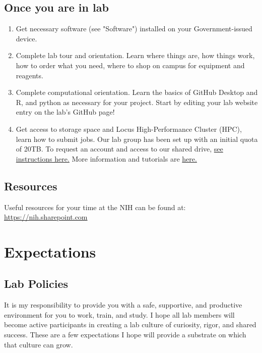\documentclass[10pt, letterpaper, twocolumn]{article} %
\begin{document}
\subsection{Once you are in lab}
\begin{enumerate}
\item Get necessary software (see "Software") installed on your Government-issued device.
\item Complete lab tour and orientation. Learn where things are, how things work, how to order what you need, where to shop on campus for equipment and reagents.
\item Complete computational orientation. Learn the basics of GitHub Desktop and R, and python as necessary for your project. Start by editing your lab website entry on the lab's GitHub page!
\item Get access to storage space and Locus High-Performance Cluster (HPC), learn how to submit jobs. Our lab group has been set up with an initial quota of 20TB. To request an account and access to our shared drive, \href{https://locus.niaid.nih.gov/userportal/documentation.php#Getting-Started/Request-an-Account}{see instructions here.} More information and tutorials are \href{https://locus.niaid.nih.gov}{here.}
\end{enumerate}

\subsection{Resources}
Useful resources for your time at the NIH can be found at: \href{https://nih.sharepoint.com}{https://nih.sharepoint.com}

\section{Expectations}
\subsection{Lab Policies}
It is my responsibility to provide you with a safe, supportive, and productive environment for you to work, train, and study. I hope all lab members will become active participants in creating a lab culture of curiosity, rigor, and shared success. These are a few expectations I hope will provide a substrate on which that culture can grow.
\end{document}
